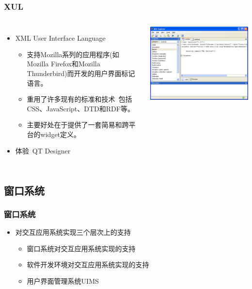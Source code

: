 \documentclass{beamer}
\begin{document}
\begin{frame}
	\frametitle{XUL}
	\beamertemplatetransparentcovereddynamicmedium
	\begin{columns}
	\begin{itemize}
		\item XML User Interface Language
		\begin{itemize}
			\item 支持Mozilla系列的应用程序{\tiny (如Mozilla Firefox和Mozilla Thunderbird)}而开发的用户界面标记语言。
			\item 重用了许多现有的标准和技术~{\tiny 包括CSS、JavaScript、DTD和RDF等。}
			\item 主要好处在于提供了一套简易和跨平台的widget定义。
		\end{itemize}
		\pause
		\item 体验~{\tiny QT Designer}
	\end{itemize}
	\includegraphics[width=\textwidth]{images/xulexplorer.png}
	\end{columns}
\end{frame}

\subsection{窗口系统}
\begin{frame}
	\frametitle{窗口系统}
	\beamertemplatetransparentcovereddynamicmedium
	\begin{itemize}[<+->]
		\item 对交互应用系统实现三个层次上的支持
		\begin{itemize}
			\item 窗口系统对交互应用系统实现的支持
			\item 软件开发环境对交互应用系统实现的支持
			\item 用户界面管理系统UIMS
		\end{itemize}
	\end{itemize}
\end{frame}
\end{document}
